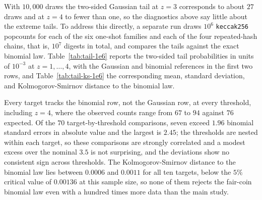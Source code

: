 \documentclass[11pt]{article}
\begin{document}
With $10{,}000$ draws the two-sided Gaussian tail at $z=3$ corresponds to
about $27$ draws and at $z=4$ to fewer than one, so the diagnostics above say
little about the extreme tails. To address this directly, a separate run
draws $10^{6}$ \texttt{keccak256} popcounts for each of the six one-shot
families and each of the four repeated-hash chains, that is, $10^{7}$ digests
in total, and compares the tails against the exact binomial law.
Table~\ref{tab:tail-1e6} reports the two-sided tail probabilities in units of
$10^{-3}$ at $z=1,\dots,4$, with the Gaussian and binomial references in the
first two rows, and Table~\ref{tab:tail-ks-1e6} the corresponding mean,
standard deviation, and Kolmogorov-Smirnov distance to the binomial law.

\begin{table}[htbp]
\centering
\small

\caption{Two-sided tail probabilities $\mathbb{P}(|S-128|\ge 8z)$ in units of
$10^{-3}$ from $10^{6}$ draws per target, against the continuous Gaussian and
the exact $\mathrm{Binomial}(256,\tfrac12)$ references. At $z=4$ the binomial
reference corresponds to $76$ expected draws.}
\label{tab:tail-1e6}
\end{table}

\begin{table}[htbp]
\centering
\small

\caption{Mean, standard deviation, and Kolmogorov-Smirnov distance to the exact
binomial law from $10^{6}$ draws per target. The $5\%$ critical value at this
sample size is $1.36/\sqrt{10^{6}}=0.00136$.}
\label{tab:tail-ks-1e6}
\end{table}

Every target tracks the binomial row, not the Gaussian row, at every
threshold, including $z=4$, where the observed counts range from $67$ to $94$
against $76$ expected. Of the $70$ target-by-threshold comparisons, seven
exceed $1.96$ binomial standard errors in absolute value and the largest is
$2.45$; the thresholds are nested within each target, so these comparisons are
strongly correlated and a modest excess over the nominal $3.5$ is not
surprising, and the deviations show no consistent sign across thresholds. The
Kolmogorov-Smirnov distance to the binomial law lies between $0.0006$ and
$0.0011$ for all ten targets, below the $5\%$ critical value of $0.00136$ at
this sample size, so none of them rejects the fair-coin binomial law even with
a hundred times more data than the main study.
\end{document}
